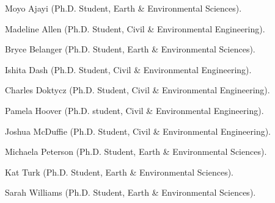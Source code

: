 \item Moyo Ajayi (Ph.D. Student, Earth \& Environmental Sciences).
\item Madeline Allen (Ph.D. Student, Civil \& Environmental Engineering).
\item Bryce Belanger (Ph.D. Student, Earth \& Environmental Sciences).
\item Ishita Dash (Ph.D. Student, Civil \& Environmental Engineering).
\item Charles Doktycz (Ph.D. Student, Civil \& Environmental Engineering).
\item Pamela Hoover (Ph.D. student, Civil \& Environmental Engineering).
\item Joshua McDuffie (Ph.D. Student, Civil \& Environmental Engineering).
\item Michaela Peterson (Ph.D. Student, Earth \& Environmental Sciences).
\item Kat Turk (Ph.D. Student, Earth \& Environmental Sciences).
\item Sarah Williams (Ph.D. Student, Earth \& Environmental Sciences).
